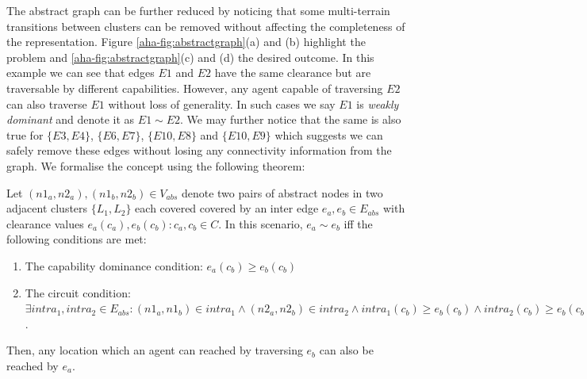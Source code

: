 The abstract graph can be further reduced by noticing that some multi-terrain transitions between clusters can be removed without affecting the completeness of the representation. 
Figure \ref{aha-fig:abstractgraph}(a) and (b) highlight the problem and \ref{aha-fig:abstractgraph}(c) and (d) the desired outcome.
In this example we can see that edges $E1$ and $E2$ have the same clearance but are traversable by different capabilities. 
However, any agent capable of traversing $E2$ can also traverse $E1$ without loss of generality. 
In such cases we say $E1$ is \emph{weakly dominant} and denote it as $E1 \sim E2$. 
We may further notice that the same is also true for $\lbrace E3, E4 \rbrace$, $\lbrace E6, E7 \rbrace$, $\lbrace E10, E8 \rbrace$ and $\lbrace E10, E9 \rbrace$ which suggests we can safely remove these edges without losing any connectivity information from the graph. 
We formalise the concept using the following theorem:
\begin{theorem}
\label{aha-theorem:weakdominance}
Let $(n1_{a}, n2_{a}), (n1_{b}, n2_{b}) \in V_{abs}$ denote two pairs of abstract nodes in two adjacent clusters $\lbrace L_{1}, L_{2} \rbrace$ each covered covered by an inter edge $e_{a}, e_{b} \in E_{abs}$ with clearance values $e_{a}(c_{a}), e_{b}(c_{b})  : c_{a}, c_{b} \in C$.
 In this scenario, $e_{a} \sim e_{b}$ iff the following conditions are met:
\begin{enumerate}
\item{The capability dominance condition: $e_{a}(c_{b}) \geq e_{b}(c_{b})$}
\item{The circuit condition: $\exists intra_{1}, intra_{2} \in E_{abs} : (n1_{a}, n1_{b}) \in intra_{1} \wedge (n2_{a}, n2_{b}) \in intra_{2} \wedge intra_{1}(c_{b}) \geq e_{b}(c_{b}) \wedge intra_{2}(c_{b}) \geq e_{b}(c_{b})$.}
\end{enumerate}
Then, any location which an agent can reached by traversing $e_{b}$ can also be reached by $e_{a}$.
\end{theorem} 

